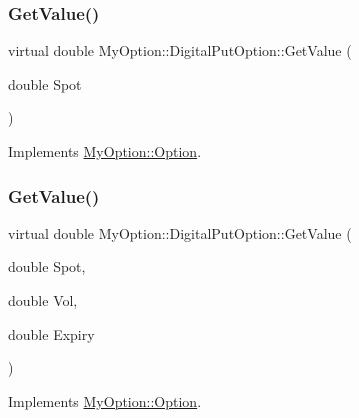 \subsubsection{\texorpdfstring{Get\+Value()}{GetValue()}\hspace{0.1cm}{\footnotesize\ttfamily [1/3]}}
{\footnotesize\ttfamily virtual double My\+Option\+::\+Digital\+Put\+Option\+::\+Get\+Value (\begin{DoxyParamCaption}\item[{double}]{Spot }\end{DoxyParamCaption})\hspace{0.3cm}{\ttfamily [virtual]}}



Implements \hyperlink{classMyOption_1_1Option_aff32b402a5e44fca9e5a22a142fbbdd6}{My\+Option\+::\+Option}.

\hypertarget{classMyOption_1_1DigitalPutOption_a3d26c1e53753a199a35f0769672e94cf}{}\label{classMyOption_1_1DigitalPutOption_a3d26c1e53753a199a35f0769672e94cf} 
\subsubsection{\texorpdfstring{Get\+Value()}{GetValue()}\hspace{0.1cm}{\footnotesize\ttfamily [2/3]}}
{\footnotesize\ttfamily virtual double My\+Option\+::\+Digital\+Put\+Option\+::\+Get\+Value (\begin{DoxyParamCaption}\item[{double}]{Spot,  }\item[{double}]{Vol,  }\item[{double}]{Expiry }\end{DoxyParamCaption})\hspace{0.3cm}{\ttfamily [virtual]}}



Implements \hyperlink{classMyOption_1_1Option_a78fa248dcb939e0ebaefbb944d5d9cf8}{My\+Option\+::\+Option}.

\hypertarget{classMyOption_1_1DigitalPutOption_ab55e215fef7a85bb06175a05548a3f77}{}\label{classMyOption_1_1DigitalPutOption_ab55e215fef7a85bb06175a05548a3f77} 
